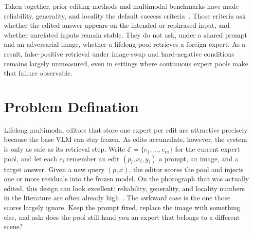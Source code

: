\documentclass[letterpaper]{article} %
\begin{document}

Taken together, prior editing methods and multimodal benchmarks have made reliability, generality, and locality the default success criteria~\citep{cheng2023mmedit,huang2024vlkeb,chen2025liveedit}.
Those criteria ask whether the edited answer appears on the intended or rephrased input, and whether unrelated inputs remain stable.
They do not ask, under a shared prompt and an adversarial image, whether a lifelong pool retrieves a foreign expert.
As a result, false-positive retrieval under image-swap and hard-negative conditions remains largely unmeasured, even in settings where continuous expert pools make that failure observable.


\section{Problem Defination}
\label{sec:problem}

Lifelong multimodal editors that store one expert per edit are attractive precisely because the base VLM can stay frozen.
As edits accumulate, however, the system is only as safe as its retrieval step.
Write $\mathcal{E}=\{e_1,\ldots,e_m\}$ for the current expert pool, and let each $e_i$ remember an edit $(p_i,x_i,y_i)$ a prompt, an image, and a target answer.
Given a new query $(p,x)$, the editor scores the pool and injects one or more residuals into the frozen model.
On the photograph that was actually edited, this design can look excellent: reliability, generality, and locality numbers in the literature are often already high~\cite{cheng2023mmedit,huang2024vlkeb,chen2025liveedit}.
The awkward case is the one those scores largely ignore.
Keep the prompt fixed, replace the image with something else, and ask: does the pool still hand you an expert that belongs to a different scene?
\end{document}

